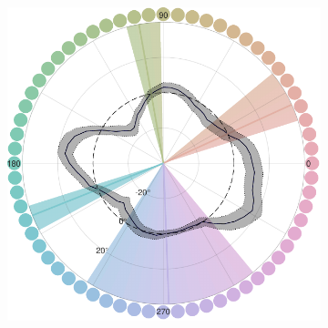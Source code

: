 \begin{figure}
\begin{subfigure}[b]{0.49\textwidth}
         \includegraphics[width=\textwidth]{../../../Analyses/211108_090705_Castor/210517--211108_Castor_categorybias2_230225.pdf}    
         \label{fig:BiasCurvesCastor}
    \end{subfigure}
    

\end{figure}
